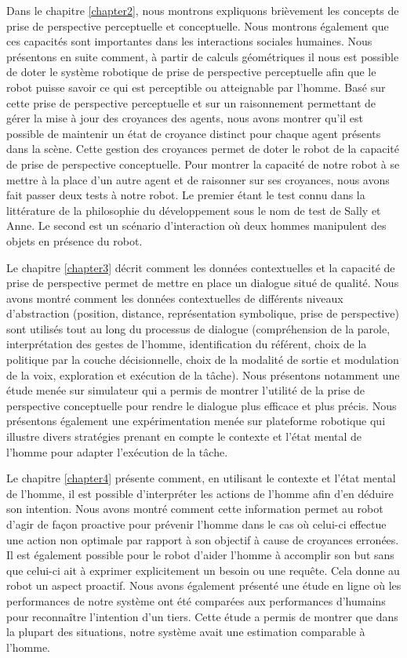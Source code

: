 \documentclass[a4paper,11pt,twoside]{StyleThese}
\begin{document}
Dans le chapitre \ref{chapter2}, nous montrons expliquons brièvement les concepts de prise de perspective perceptuelle et conceptuelle. Nous montrons également que ces capacités sont importantes dans les interactions sociales humaines. Nous présentons en suite comment, à partir de calculs géométriques il nous est possible de doter le système robotique de prise de perspective perceptuelle afin que le robot puisse savoir ce qui est perceptible ou atteignable par l'homme.
Basé sur cette prise de perspective perceptuelle et sur un raisonnement permettant de gérer la mise à jour des croyances des agents, nous avons montrer qu'il est possible de maintenir un état de croyance distinct pour chaque agent présents dans la scène. Cette gestion des croyances permet de doter le robot de la capacité de prise de perspective conceptuelle.
Pour montrer la capacité de notre robot à se mettre à la place d'un autre agent et de raisonner sur ses croyances, nous avons fait passer deux tests à notre robot. Le premier étant le test connu dans la littérature de la philosophie du développement sous le nom de test de Sally et Anne. Le second est un scénario d'interaction où deux hommes manipulent des objets en présence du robot.

Le chapitre \ref{chapter3} décrit comment les données contextuelles et la capacité de prise de perspective permet de mettre en place un dialogue situé de qualité. Nous avons montré comment les données contextuelles de différents niveaux d'abstraction (position, distance, représentation symbolique, prise de perspective) sont utilisés tout au long du processus de dialogue (compréhension de la parole, interprétation des gestes de l'homme, identification du référent, choix de la politique par la couche décisionnelle, choix de la modalité de sortie et modulation de la voix, exploration et exécution de la tâche).
Nous présentons notamment une étude menée sur simulateur qui a permis de montrer l'utilité de la prise de perspective conceptuelle pour rendre le dialogue plus efficace et plus précis. Nous présentons également une expérimentation menée sur plateforme robotique qui illustre divers stratégies prenant en compte le contexte et l'état mental de l'homme pour adapter l'exécution de la tâche.

Le chapitre \ref{chapter4} présente comment, en utilisant le contexte et l'état mental de l'homme, il est possible d'interpréter les actions de l'homme afin d'en déduire son intention. Nous avons montré comment cette information permet au robot d'agir de façon proactive pour prévenir l'homme dans le cas où celui-ci effectue une action non optimale par rapport à son objectif à cause de croyances erronées. Il est également possible pour le robot d'aider l'homme à accomplir son but sans que celui-ci ait à exprimer explicitement un besoin ou une requête. Cela donne au robot un aspect proactif. Nous avons également présenté une étude en ligne où les performances de notre système ont été comparées aux performances d'humains pour reconnaître l'intention d'un tiers. Cette étude a permis de montrer que dans la plupart des situations, notre système avait une estimation comparable à l'homme.
\end{document}
